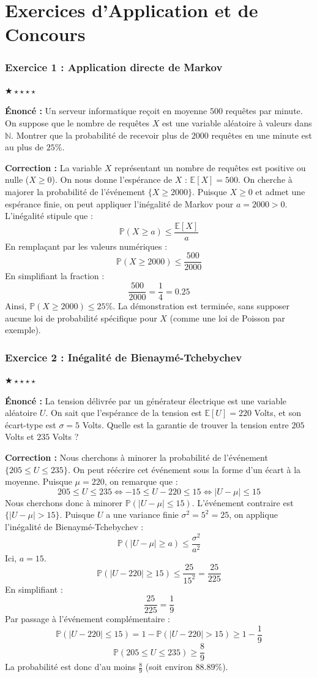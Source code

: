 \documentclass[11pt,a4paper]{article}
\begin{document}
\newpage
\part{Exercices d'Application et de Concours}
\section*{Exercice 1 : Application directe de Markov}

$\bigstar\star\star\star\star$

\textbf{Énoncé :}
Un serveur informatique reçoit en moyenne $500$ requêtes par minute. On suppose que le nombre de requêtes $X$ est une variable aléatoire à valeurs dans $\mathbb{N}$.
Montrer que la probabilité de recevoir plus de $2000$ requêtes en une minute est au plus de $25\%$.

\textbf{Correction :}
La variable $X$ représentant un nombre de requêtes est positive ou nulle ($X \ge 0$).
On nous donne l'espérance de $X$ : $\mathbb{E}[X] = 500$.
On cherche à majorer la probabilité de l'événement $\{X \ge 2000\}$.
Puisque $X \ge 0$ et admet une espérance finie, on peut appliquer l'inégalité de Markov pour $a = 2000 > 0$.
L'inégalité stipule que :
$$ \mathbb{P}(X \ge a) \le \frac{\mathbb{E}[X]}{a} $$
En remplaçant par les valeurs numériques :
$$ \mathbb{P}(X \ge 2000) \le \frac{500}{2000} $$
En simplifiant la fraction :
$$ \frac{500}{2000} = \frac{1}{4} = 0.25 $$
Ainsi, $\mathbb{P}(X \ge 2000) \le 25\%$.
La démonstration est terminée, sans supposer aucune loi de probabilité spécifique pour $X$ (comme une loi de Poisson par exemple).


\section*{Exercice 2 : Inégalité de Bienaymé-Tchebychev}

$\bigstar\star\star\star\star$

\textbf{Énoncé :}
La tension délivrée par un générateur électrique est une variable aléatoire $U$. On sait que l'espérance de la tension est $\mathbb{E}[U] = 220$ Volts, et son écart-type est $\sigma = 5$ Volts.
Quelle est la garantie de trouver la tension entre $205$ Volts et $235$ Volts ?

\textbf{Correction :}
Nous cherchons à minorer la probabilité de l'événement $\{205 \le U \le 235\}$.
On peut réécrire cet événement sous la forme d'un écart à la moyenne. Puisque $\mu = 220$, on remarque que :
$$ 205 \le U \le 235 \iff -15 \le U - 220 \le 15 \iff |U - \mu| \le 15 $$
Nous cherchons donc à minorer $\mathbb{P}(|U - \mu| \le 15)$.
L'événement contraire est $\{|U - \mu| > 15\}$.
Puisque $U$ a une variance finie $\sigma^2 = 5^2 = 25$, on applique l'inégalité de Bienaymé-Tchebychev :
$$ \mathbb{P}(|U - \mu| \ge a) \le \frac{\sigma^2}{a^2} $$
Ici, $a = 15$.
$$ \mathbb{P}(|U - 220| \ge 15) \le \frac{25}{15^2} = \frac{25}{225} $$
En simplifiant :
$$ \frac{25}{225} = \frac{1}{9} $$
Par passage à l'événement complémentaire :
$$ \mathbb{P}(|U - 220| \le 15) = 1 - \mathbb{P}(|U - 220| > 15) \ge 1 - \frac{1}{9} $$
$$ \mathbb{P}(205 \le U \le 235) \ge \frac{8}{9} $$
La probabilité est donc d'au moins $\frac{8}{9}$ (soit environ $88.89\%$).
\end{document}
